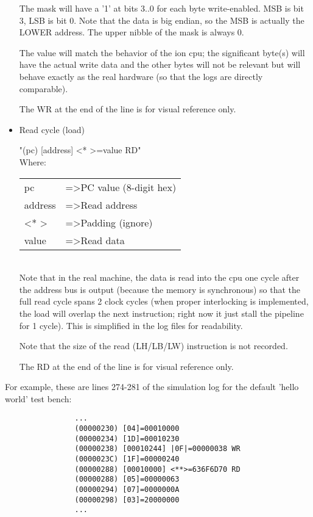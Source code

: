 \documentclass[11pt]{article}
\begin{document}
\begin{itemize}
        The mask will have a '1' at bits 3..0 for each byte write-enabled. MSB
        is bit 3, LSB is bit 0. Note that the data is big endian, so the MSB
        is actually the LOWER address. The upper nibble of the mask is always 0.

        The value will match the behavior of the ion cpu; the significant
        byte(s) will have the actual write data and the other bytes will not
        be relevant but will behave exactly as the real hardware (so that the
        logs are directly comparable).

        The WR at the end of the line is for visual reference only.

    \item Read cycle (load)

        "(pc) [address] \textless ** \textgreater =value RD"\\

        Where:
        
        \begin{tabular}{ l l }
        pc      & =\textgreater PC value (8-digit hex)\\
        address & =\textgreater Read address\\
        \textless ** \textgreater    & =\textgreater Padding (ignore)\\
        value   & =\textgreater Read data\\
        \end{tabular}\\

        Note that in the real machine, the data is read into the cpu one cycle
        after the address bus is output (because the memory is synchronous) so
        that the full read cycle spans 2 clock cycles (when proper interlocking
        is implemented, the load will overlap the next instruction; right now
        it just stall the pipeline for 1 cycle). This is simplified in the log
        files for readability.

        Note that the size of the read (LH/LB/LW) instruction is not recorded.

        The RD at the end of the line is for visual reference only.

    \end{itemize}
       

    For example, these are lines 274-281 of the simulation log for the
    default 'hello world' test bench:

                \begin{verbatim}
                ...
                (00000230) [04]=00010000
                (00000234) [1D]=00010230
                (00000238) [00010244] |0F|=00000038 WR
                (0000023C) [1F]=00000240
                (00000288) [00010000] <**>=636F6D70 RD
                (00000288) [05]=00000063
                (00000294) [07]=0000000A
                (00000298) [03]=20000000
                ...
                \end{verbatim}\\
\end{document}
